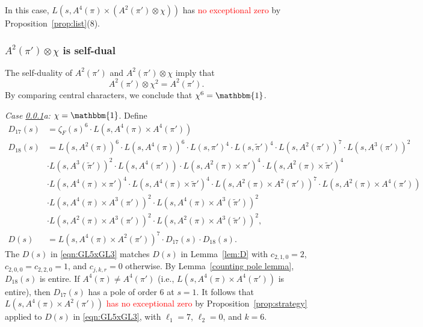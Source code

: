 \documentclass[11pt]{amsart}
\theoremstyle{remark}
\numberwithin{equation}{section}
\begin{document}
In this case, $L(s,A^4(\pi) \times (A^2(\pi') \otimes \chi))$ has \textcolor{red}{no exceptional zero} by Proposition~\ref{prop:list}(8). 

\subsubsection{$A^2(\pi') \otimes \chi$ is self-dual}
\label{A^2(pi')otimeschiisself-dual}

The self-duality of $A^2(\pi')$ and $A^2(\pi') \otimes \chi$ imply that
\begin{equation}
\label{eqn:A2_twist_SD}
A^2(\pi') \otimes \chi^2 = A^2(\pi').
\end{equation}
By comparing central characters, we conclude that $\chi^6=\mathbbm{1}$.

{\it Case \ref{A^2(pi')otimeschiisself-dual}a: $\chi=\mathbbm{1}$}.  Define
\begin{equation}
\label{eqn:GL5xGL3}
\begin{aligned}
    D_{17}(s) &= \zeta_F(s)^6 \cdot L(s,A^4(\pi) \times A^4(\pi')) \\
    D_{18}(s) &= L(s,A^2(\pi))^6\cdot L(s,A^4(\pi))^6\cdot L(s,\pi')^4 \cdot L(s,\widetilde{\pi}')^4 \cdot L(s,A^2(\pi'))^7\cdot L(s,A^3(\pi'))^2\\
    & \cdot L(s,A^3(\widetilde{\pi}'))^2 \cdot L(s,A^4(\pi')) \cdot L(s,A^2(\pi) \times \pi')^4 \cdot L(s,A^2(\pi) \times \widetilde{\pi}')^4\\
    &\cdot L(s,A^4(\pi) \times \pi')^4 \cdot L(s,A^4(\pi) \times \widetilde{\pi}')^4 \cdot L(s,A^2(\pi) \times A^2(\pi'))^7\cdot L(s,A^2(\pi) \times A^4(\pi'))\\
    &\cdot L(s,A^4(\pi) \times A^3(\pi'))^2 \cdot L(s,A^4(\pi) \times A^3(\widetilde{\pi}'))^2 \\ 
    &\cdot L(s,A^2(\pi) \times A^3(\pi'))^2 \cdot L(s,A^2(\pi) \times A^3(\widetilde{\pi}'))^2,  \\
    D(s) &= L(s,A^4(\pi) \times A^2(\pi'))^7 \cdot D_{17}(s) \cdot D_{18}(s).
\end{aligned}
\end{equation}
The $D(s)$ in \eqref{eqn:GL5xGL3} matches $D(s)$ in Lemma~\ref{lem:D} with $c_{2,1,0} = 2$, $c_{2,0,0}=c_{2,2,0} = 1$, and $c_{j,k,r}=0$ otherwise.  By Lemma~\ref{counting pole lemma}, $D_{18}(s)$ is entire. If $A^4(\pi)\neq A^4(\pi')$ (i.e., $L(s,A^4(\pi) \times A^4(\pi'))$ is entire), then $D_{17}(s)$ has a pole of order $6$ at $s=1$.  It follows that $L(s,A^4(\pi) \times A^2(\pi'))$ \textcolor{red}{has no exceptional zero} by Proposition~\ref{prop:strategy} applied to $D(s)$ in \eqref{eqn:GL5xGL3}, with $\ell_1 = 7$, $\ell_2 = 0$, and $k = 6$. 
\end{document}
